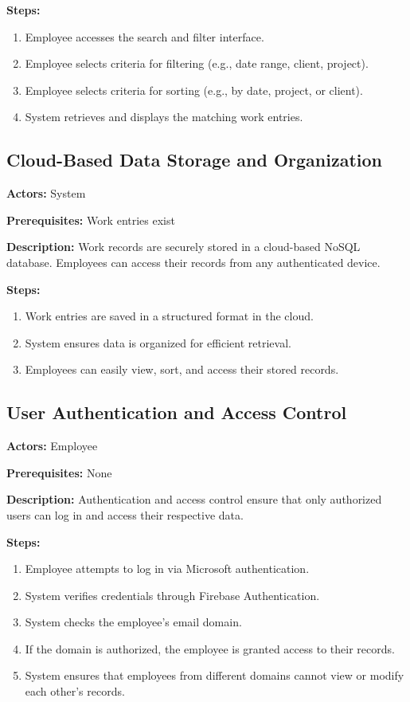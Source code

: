 \documentclass[
  digital,     %
  oneside,     %
  nosansbold,  %
  nocolorbold, %
  lof,         %
  lot,         %
]{fithesis4}
\begin{document}
\noindent \textbf{Steps:}
\begin{enumerate}
    \item Employee accesses the search and filter interface.
    \item Employee selects criteria for filtering (e.g., date range, client, project).
    \item Employee selects criteria for sorting (e.g., by date, project, or client).
    \item System retrieves and displays the matching work entries.
\end{enumerate}

\subsection{Cloud-Based Data Storage and Organization}

\noindent \textbf{Actors:} System

\noindent \textbf{Prerequisites:} Work entries exist

\noindent \textbf{Description:}  
Work records are securely stored in a cloud-based NoSQL database. Employees can access their records from any authenticated device.

\noindent \textbf{Steps:}
\begin{enumerate}
    \item Work entries are saved in a structured format in the cloud.
    \item System ensures data is organized for efficient retrieval.
    \item Employees can easily view, sort, and access their stored records.
\end{enumerate}

\subsection{User Authentication and Access Control}

\noindent \textbf{Actors:} Employee

\noindent \textbf{Prerequisites:} None

\noindent \textbf{Description:}  
Authentication and access control ensure that only authorized users can log in and access their respective data.

\noindent \textbf{Steps:}
\begin{enumerate}
    \item Employee attempts to log in via Microsoft authentication.
    \item System verifies credentials through Firebase Authentication.
    \item System checks the employee’s email domain.
    \item If the domain is authorized, the employee is granted access to their records.
    \item System ensures that employees from different domains cannot view or modify each other's records.
\end{enumerate}
\end{document}
